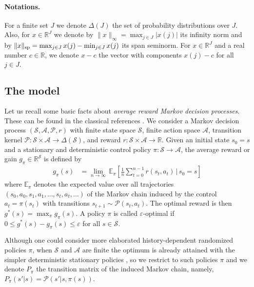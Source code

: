 \documentclass{article}
\newcommand{\cA}{\mathcal{A}}
\newcommand{\cS}{\mathcal{S}}
\newcommand{\cM}{\Delta}
\newcommand{\cP}{\mathcal{P} }
\newcommand{\expec}{\mathbb{E}}
\newcommand{\real}{\mathbb{R}}
\newcommand{\reals}{\mathbb{R}}
\renewcommand{\sp}[1]{\|{#1}\|_\text{\rm sp}}
\newcommand{\R}{r}
\theoremstyle{plain}
\theoremstyle{definition}
\theoremstyle{remark}
\begin{document}
\paragraph{Notations.} For a finite set $J$ we denote $\cM(J)$ the set of probability distributions over $J$. Also, for $x\in\reals^J$ we denote by $\|x\|_{\infty}=\max_{j\in J}|x(j)|$ its infinity norm and by $\sp{x}=\max_{j\in J}x(j)-\min_{j\in J}x(j)$ its  span seminorm. For $x\in\reals^{J}$ and a real number $c\in\reals$, we denote $x-c$ the vector with components $x(j)-c$ for all $j\in J$. 

\subsection{The model} \label{se:model} Let us recall some basic facts about {\em average reward Markov decision processes}. These
 can be found in the classical references \citep{bertsekas2015dynamic,10.5555/528623,  sutton2018reinforcement}.
We consider a Markov decision process $(\cS, \cA, \cP, \R)$ with finite state space $\cS$, finite action space $\cA$, transition kernel $\cP\colon \cS \times \cA \rightarrow \cM(\cS)$, and reward $\R\colon  \cS \times \cA \rightarrow \real$. 
Given an initial state $s_0=s$ and a stationary and deterministic control policy $\pi\colon \cS \rightarrow \cA$, the average reward or gain
$g_\pi\in\reals^\cS$
is defined by
\vspace{-0.5ex}
\begin{align*}
    g_{\pi}(s)&=\lim_{n\rightarrow \infty} \,\mbox{$\expec_{\pi}\!\left[\frac{1}{n}\sum^{n-1}_{t=0}  \R(s_t, a_t) \,|\, s_0=s\right]$}
\end{align*}
 where $\expec_{\pi}$ denotes the expected value over all trajectories $(s_0, a_0, s_1, a_1, \dots, s_{t}, a_{t},\dots)$ of the Markov chain induced by the control $a_t=\pi(s_t)$ with transitions $s_{t+1}\sim\cP(s_t,a_t)$. 
The optimal reward is then $g^*(s)=\max_{\pi}g_{\pi}(s)$. A policy $\pi$ is called $\varepsilon$-optimal if $0\leq g^*(s)-g_\pi(s)\leq\varepsilon$ for all  $s\in\cS$. 

Although one could consider more elaborated history-dependent randomized policies $\pi$, when $\cS$ and $\cA$ are finite the optimum
is already attained with the simpler deterministic stationary policies \citep{10.5555/528623}, so we restrict to such policies $\pi$ and we denote $P_\pi$ the transition matrix of the induced Markov chain, namely, $P_\pi(s'|s)=\cP(s'|s,\pi(s))$.
\end{document}
